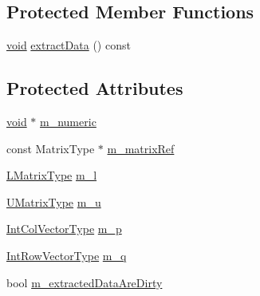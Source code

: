 \subsection*{Protected Member Functions}
\begin{DoxyCompactItemize}
\item 
\hyperlink{group___u_a_v_objects_plugin_ga444cf2ff3f0ecbe028adce838d373f5c}{void} \hyperlink{class_sparse_l_u_3_01_matrix_type_00_01_umf_pack_01_4_a3455a4f96e8508ee66411a880a4bbca2}{extract\-Data} () const 
\end{DoxyCompactItemize}
\subsection*{Protected Attributes}
\begin{DoxyCompactItemize}
\item 
\hyperlink{group___u_a_v_objects_plugin_ga444cf2ff3f0ecbe028adce838d373f5c}{void} $\ast$ \hyperlink{class_sparse_l_u_3_01_matrix_type_00_01_umf_pack_01_4_a05a6a0d11e3fdbbcec5a046e0f2f5b7a}{m\-\_\-numeric}
\item 
const Matrix\-Type $\ast$ \hyperlink{class_sparse_l_u_3_01_matrix_type_00_01_umf_pack_01_4_ad8b2159b6faaba6aefca769598fa587b}{m\-\_\-matrix\-Ref}
\item 
\hyperlink{class_sparse_l_u_3_01_matrix_type_00_01_umf_pack_01_4_a2900542d2fe0efa2c2d858cd9ca9953f}{L\-Matrix\-Type} \hyperlink{class_sparse_l_u_3_01_matrix_type_00_01_umf_pack_01_4_a83b493c5fd33f69d053da81f15ef6a0e}{m\-\_\-l}
\item 
\hyperlink{class_sparse_l_u_3_01_matrix_type_00_01_umf_pack_01_4_a22232647515b18b74cd7c1dadc5d85df}{U\-Matrix\-Type} \hyperlink{class_sparse_l_u_3_01_matrix_type_00_01_umf_pack_01_4_a59093788300b1912865d3b5d4e492ff6}{m\-\_\-u}
\item 
\hyperlink{class_sparse_l_u_3_01_matrix_type_00_01_umf_pack_01_4_af06161423c3dde25ec3431a7e87b66e8}{Int\-Col\-Vector\-Type} \hyperlink{class_sparse_l_u_3_01_matrix_type_00_01_umf_pack_01_4_a3a81ccfca33be6598519b2e3c395f613}{m\-\_\-p}
\item 
\hyperlink{class_sparse_l_u_3_01_matrix_type_00_01_umf_pack_01_4_ad6789d8ef818adc250479ca6b0d7f340}{Int\-Row\-Vector\-Type} \hyperlink{class_sparse_l_u_3_01_matrix_type_00_01_umf_pack_01_4_ac9a108ecc0517ad1793e082b536d67be}{m\-\_\-q}
\item 
bool \hyperlink{class_sparse_l_u_3_01_matrix_type_00_01_umf_pack_01_4_ac5038610497e25cdbda03a44838b7a53}{m\-\_\-extracted\-Data\-Are\-Dirty}
\end{DoxyCompactItemize}


